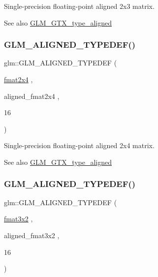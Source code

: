 Single-\/precision floating-\/point aligned 2x3 matrix. \begin{DoxySeeAlso}{See also}
\mbox{\hyperlink{group__gtx__type__aligned}{G\+L\+M\+\_\+\+G\+T\+X\+\_\+type\+\_\+aligned}} 
\end{DoxySeeAlso}
\mbox{\label{group__gtx__type__aligned_ga1a76b325fdf70f961d835edd182c63dd}} 
\subsubsection{\texorpdfstring{GLM\_ALIGNED\_TYPEDEF()}{GLM\_ALIGNED\_TYPEDEF()}\hspace{0.1cm}{\footnotesize\ttfamily [174/209]}}
{\footnotesize\ttfamily glm\+::\+G\+L\+M\+\_\+\+A\+L\+I\+G\+N\+E\+D\+\_\+\+T\+Y\+P\+E\+D\+EF (\begin{DoxyParamCaption}\item[{\mbox{\hyperlink{group__gtc__type__precision_ga76578ee3c2d6de9b46d0efd1c7060b85}{fmat2x4}}}]{,  }\item[{aligned\+\_\+fmat2x4}]{,  }\item[{16}]{ }\end{DoxyParamCaption})}

Single-\/precision floating-\/point aligned 2x4 matrix. \begin{DoxySeeAlso}{See also}
\mbox{\hyperlink{group__gtx__type__aligned}{G\+L\+M\+\_\+\+G\+T\+X\+\_\+type\+\_\+aligned}} 
\end{DoxySeeAlso}
\mbox{\label{group__gtx__type__aligned_ga4b4e181cd041ba28c3163e7b8074aef0}} 
\subsubsection{\texorpdfstring{GLM\_ALIGNED\_TYPEDEF()}{GLM\_ALIGNED\_TYPEDEF()}\hspace{0.1cm}{\footnotesize\ttfamily [175/209]}}
{\footnotesize\ttfamily glm\+::\+G\+L\+M\+\_\+\+A\+L\+I\+G\+N\+E\+D\+\_\+\+T\+Y\+P\+E\+D\+EF (\begin{DoxyParamCaption}\item[{\mbox{\hyperlink{group__gtc__type__precision_gab194ac1a68dbcb228384112ebe531c67}{fmat3x2}}}]{,  }\item[{aligned\+\_\+fmat3x2}]{,  }\item[{16}]{ }\end{DoxyParamCaption})}

